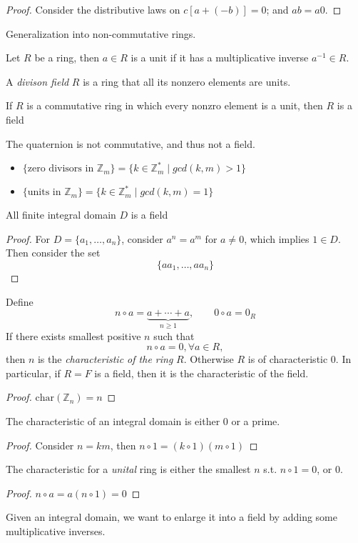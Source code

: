 \begin{proof}
Consider the distributive laws on $c[a+(-b)]=0$; and $ab=a0$.
\end{proof}
\begin{remark}
Generalization into non-commutative rings.
\end{remark}
\begin{definition}
Let $R$ be a ring, then $a\in R$ is a unit if it has a multiplicative inverse $a^{-1}\in R$.
\end{definition}
\begin{definition}
A \emph{divison field} $R$ is a ring that all its nonzero elements are units.

If $R$ is a commutative ring in which every nonzro element is a unit, then $R$ is a field
\end{definition}
\begin{remark}
The quaternion is not commutative, and thus not a field.
\end{remark}
\begin{itemize}
\item
$\{\mbox{zero divisors in $\mathbb{Z}_m$}\} = \{k\in\mathbb{Z}_m^{*}\mid gcd(k,m)>1\}$
\item
$\{\mbox{units in $\mathbb{Z}_m$}\} = \{k\in\mathbb{Z}_m^{*}\mid gcd(k,m)=1\}$
\end{itemize}
\begin{proposition}
All finite integral domain $D$ is a field
\end{proposition}
\begin{proof}
For $D=\{a_1,\dots,a_n\}$, consider $a^n=a^m$ for $a\ne0$, which implies $1\in D$. Then consider the set
\[
\{aa_1,\dots,aa_n\}
\]
\end{proof}
\begin{definition}[Char]
Define
\[
n\circ a=\underbrace{a+\cdots+a}_{n\ge1},\qquad
0\circ a=0_R
\]
If there exists smallest positive $n$ such that
\[
n\circ a=0,\forall a\in R,
\]
then $n$ is the \emph{characteristic of the ring }$R$. Otherwise $R$ is of characteristic $0$. In particular, if $R=F$ is a field, then it is the characteristic of the field.
\end{definition}
\begin{proof}
$\mbox{char}(\mathbb{Z}_n)=n$
\end{proof}
\begin{proposition}
The characteristic of an integral domain is either $0$ or a prime.
\end{proposition}
\begin{proof}
Consider $n=km$, then $n\circ 1=(k\circ 1)(m\circ 1)$
\end{proof}
\begin{theorem}
The characteristic for a \emph{unital} ring is either the smallest $n$ s.t. $n\circ 1=0$, or 0.
\end{theorem}
\begin{proof}
$n\circ a=a(n\circ 1)=0$
\end{proof}
Given an integral domain, we want to enlarge it into a field by adding some multiplicative inverses.
